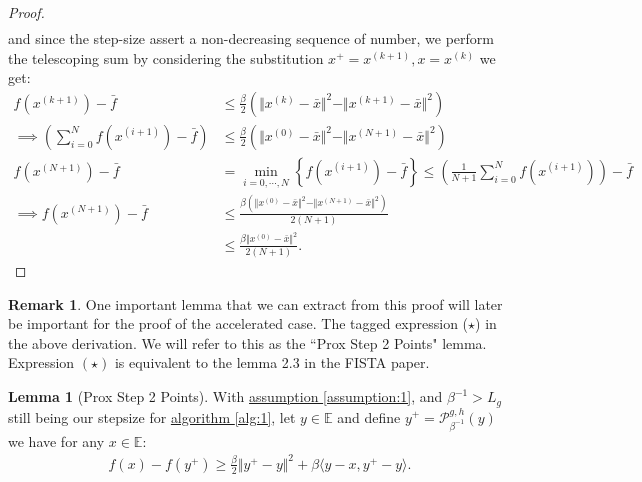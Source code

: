 \documentclass[]{article}
\theoremstyle{definition}
\newtheorem{lemma}{Lemma}[subsection]  %
\newtheorem{remark}{Remark}[subsection]
{
    \newtheorem{assumption}{Assumption}
}
\begin{document}
\begin{proof}
\begin{align*}
            \end{align*}
            and since the step-size assert a non-decreasing sequence of number, we perform the telescoping sum by considering the substitution $x^+ = x^{(k + 1)}, x = x^{(k)}$ we get: 
            \begin{align*}
                f(x^{(k + 1)}) - \bar f 
                &\le
                \frac{\beta}{2}(\Vert x^{(k)} - \bar x\Vert^2 - \Vert x^{(k + 1)} - \bar x\Vert^2)
                \\
                \implies
                \left(
                    \sum_{i = 0}^{N} f(x^{(i + 1)})
                    - \bar f
                \right)
                &\le
                \frac{\beta}{2}
                (\Vert x^{(0)} - \bar x\Vert^2 - \Vert x^{(N + 1)} - \bar x\Vert^2)
                \\
                f(x^{(N + 1)}) - \bar f & = 
                \min_{i = 0, \cdots, N}\left\lbrace
                    f(x^{(i + 1)}) - \bar f
                \right\rbrace \le 
                \left(
                    \frac{1}{N + 1}\sum_{i = 0}^{N}f(x^{(i + 1)})
                \right) - \bar f
                \\
                \implies
                f(x^{(N + 1)}) - \bar f
                &\le  
                \frac{\beta(\Vert x^{(0)} - \bar x\Vert^2 - \Vert x^{(N + 1)} - \bar x\Vert^2)}{2(N + 1)}
                \\
                &\le 
                \frac{\beta \Vert x^{(0)} - \bar x\Vert^2 }{2(N + 1)}. 
            \end{align*}
        \end{proof}
        \begin{remark}
            One important lemma that we can extract from this proof will later be important for the proof of the accelerated case. The tagged expression ($\star$) in the above derivation. We will refer to this as the ``Prox Step 2 Points" lemma. Expression $(\star)$ is equivalent to the lemma 2.3 in the FISTA paper\cite{paper:FISTA}. 
        \end{remark}
        \begin{lemma}[Prox Step 2 Points]\label{lemma:prox_two_p}
            With \hyperref[assumption:1]{assumption \ref*{assumption:1}}, and $\beta^{-1} > L_g$ still being our stepsize for \hyperref[alg:1]{algorithm \ref*{alg:1}}, let $y\in \mathbb E$ and define $y^+ = \mathcal P_{\beta^{-1}}^{g, h}(y)$ we have for any $x\in \mathbb E$: 
            \begin{align*}
                f(x) - f(y^+) \ge \frac{\beta}{2}\Vert y^+ - y\Vert^2 + 
                \beta \langle y - x, y^+ - y\rangle. 
            \end{align*}
        \end{lemma}
\end{document}
